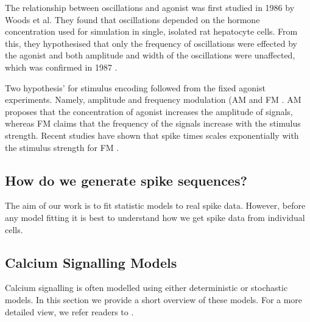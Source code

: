 \documentclass[../main.tex]{subfiles}
\begin{document}
The relationship between  oscillations and agonist was first studied in 1986 by Woods et al. \cite{Woods_1986} They found that  oscillations depended on the hormone concentration used for simulation in single, isolated rat hepatocyte cells. From this, they hypothesised that only the frequency of  oscillations were effected by the agonist and both amplitude and width of the oscillations were unaffected, which was confirmed in 1987 \cite{Woods_1987}. 


Two hypothesis' for stimulus encoding followed from the fixed agonist experiments. Namely, amplitude and frequency modulation (AM and FM \cite{Berridge_1997}. AM proposes that the concentration of agonist increases the amplitude of  signals, whereas FM claims that the frequency of the  signals increase with the stimulus strength. Recent studies have shown that  spike times scales exponentially with the stimulus strength for FM \cite{Thurley_2014}.

\subsection{How do we generate spike sequences?}
The aim of our work is to fit statistic models to real spike data. However, before any model fitting it is best to understand how we get spike data from individual cells. 


\subsection{Calcium Signalling Models}
Calcium signalling is often modelled using either deterministic or stochastic models. In this section we provide a short overview of these models. For a more detailed view, we refer readers to \cite{Sneyd_2005, Falcke_2004, Dupont_2011, Thul_2008, Dupont_2016}. 
\end{document}
